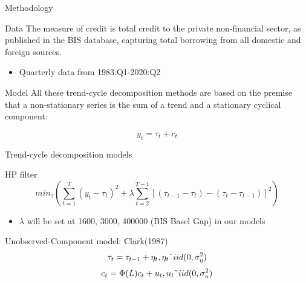 \documentclass[
  ignorenonframetext,
]{beamer}
\providecommand{\tightlist}{%
  \setlength{\itemsep}{0pt}\setlength{\parskip}{0pt}}
\begin{document}
\begin{frame}{Methodology}
\protect\hypertarget{methodology}{}
\begin{block}{Data}
\protect\hypertarget{data-1}{}
The measure of credit is total credit to the private non-financial
sector, as published in the BIS database, capturing total borrowing from
all domestic and foreign sources.

\begin{itemize}
\tightlist
\item
  Quarterly data from 1983:Q1-2020:Q2
\end{itemize}
\end{block}
\end{frame}

\begin{frame}{Model}
\protect\hypertarget{model-4}{}
All these trend-cycle decomposition methods are based on the premise
that a non-stationary series is the sum of a trend and a stationary
cyclical component:

\begin{equation}
y_{t}=\tau _{t}+c_{t}
\end{equation}
\end{frame}

\begin{frame}{Trend-cycle decomposition models}
\protect\hypertarget{trend-cycle-decomposition-models}{}
\begin{block}{HP filter}
\protect\hypertarget{hp-filter}{}
\begin{equation}
min_{\tau}(\sum^T_{t=1}(y_t-\tau_t)^2+\lambda\sum^{T-1}_{t=2}[(\tau_{t-1}-\tau_t)-(\tau_t-\tau_{t-1})]^2)
\end{equation}

\begin{itemize}
\tightlist
\item
  \(\lambda\) will be set at 1600, 3000, 400000 (BIS Basel Gap) in our
  models
\end{itemize}
\end{block}

\begin{block}{Unobserved-Component model: Clark(1987)}
\protect\hypertarget{unobserved-component-model-clark1987}{}
\begin{equation}
\tau _{t}=\tau _{t-1}+\eta _{t},\eta _{t}\symbol{126}iid(0,\sigma _{\eta
}^{2})
\end{equation} \begin{equation*}
c_{t}=\Phi (L)c_{t}+u_{t},u_{t}\symbol{126}iid(0,\sigma _{u}^{2})
\end{equation*}
\end{block}
\end{frame}
\end{document}
